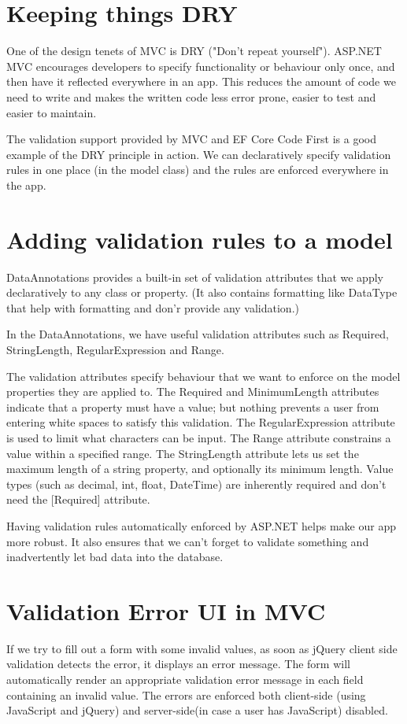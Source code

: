 \documentclass{report}
\begin{document}
    \section{Keeping things DRY}
    One of the design tenets of MVC is DRY ("Don't repeat yourself"). ASP.NET
    MVC encourages developers to specify functionality or behaviour only once,
    and then have it reflected everywhere in an app. This reduces the amount
    of code we need to write and makes the written code less error prone,
    easier to test and easier to maintain.

    The validation support provided by MVC and EF Core Code First is a good
    example of the DRY principle in action. We can declaratively specify
    validation rules in one place (in the model class) and the rules are
    enforced everywhere in the app.

    \section{Adding validation rules to a model}
    DataAnnotations provides a built-in set of validation attributes that we
    apply declaratively to any class or property. (It also contains formatting
    like DataType that help with formatting and don'r provide any validation.)

    In the DataAnnotations, we have useful validation attributes such as Required,
    StringLength, RegularExpression and Range.

    The validation attributes specify behaviour that we want to enforce on the model
    properties they are applied to. The Required and MinimumLength attributes indicate
    that a property must have a value; but nothing prevents a user from entering white
    spaces to satisfy this validation. The RegularExpression attribute is used to limit
    what characters can be input. The Range attribute constrains a value within a
    specified range. The StringLength attribute lets us set the maximum length of a string
    property, and optionally its minimum length. Value types (such as decimal, int, float,
    DateTime) are inherently required and don't need the [Required] attribute.

    Having validation rules automatically enforced by ASP.NET helps make our app
    more robust. It also ensures that we can't forget to validate something and
    inadvertently let bad data into the database.

    \section{Validation Error UI in MVC}
    If we try to fill out a form with some invalid values, as soon as jQuery client side
    validation detects the error, it displays an error message.
    The form will automatically render an appropriate validation error message in each
    field containing an invalid value. The errors are enforced both client-side (using
    JavaScript and jQuery) and server-side(in case a user has JavaScript)
    disabled.
\end{document}
